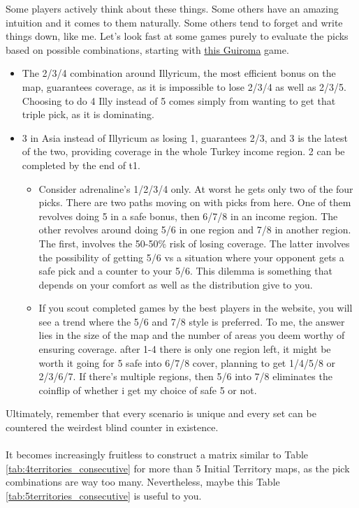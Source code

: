 Some players actively think about these things. Some others have an amazing intuition and it comes to them naturally. Some others tend to forget and write things down, like me. Let's look fast at some games purely to evaluate the picks based on possible combinations, starting with \href{https://www.warzone.com/MultiPlayer?GameID=34661130}{this Guiroma} game. 
\begin{itemize}
    \item The 2/3/4 combination around Illyricum, the most efficient bonus on the map, guarantees coverage, as it is impossible to lose 2/3/4 as well as 2/3/5. Choosing to do 4 Illy instead of 5 comes simply from wanting to get that triple pick, as it is dominating. 
    \item 3 in Asia instead of Illyricum as losing 1, guarantees 2/3, and 3 is the latest of the two, providing coverage in the whole Turkey income region. 2 can be completed by the end of t1.
    \begin{itemize}
        \item Consider adrenaline's 1/2/3/4 only. At worst he gets only two of the four picks. There are two paths moving on with picks from here. One of them revolves doing 5 in a safe bonus, then 6/7/8 in an income region. The other revolves around doing 5/6 in one region and 7/8 in another region. The first, involves the 50-50\% risk of losing coverage. The latter involves the possibility of getting 5/6 vs a situation where your opponent gets a safe pick and a counter to your 5/6. This dilemma is something that depends on your comfort as well as the distribution give to you.
        \item If you scout completed games by the best players in the website, you will see a trend where the 5/6 and 7/8 style is preferred. To me, the answer lies in the size of the map and the number of areas you deem worthy of ensuring coverage. after 1-4 there is only one region left, it might be worth it going for 5 safe into 6/7/8 cover, planning to get 1/4/5/8 or 2/3/6/7. If there's multiple regions, then 5/6 into 7/8 eliminates the coinflip of whether i get my choice of safe 5 or not.
    \end{itemize}
\end{itemize}

Ultimately, remember that every scenario is unique and every set can be countered the weirdest blind counter in existence. 
\\
\\
It becomes increasingly fruitless to construct a matrix similar to Table \ref{tab:4territories_consecutive} for more than 5 Initial Territory maps, as the pick combinations are way too many. Nevertheless, maybe this Table \ref{tab:5territories_consecutive} is useful to you. 

